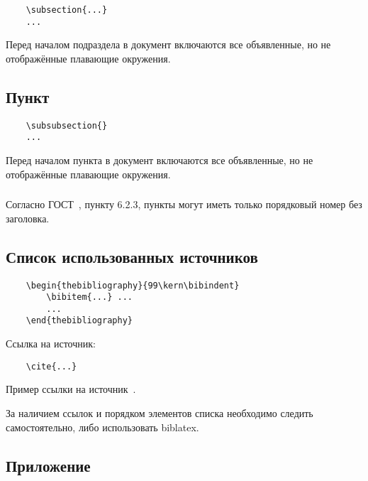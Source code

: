 \documentclass[14pt, a4paper, titlepage]{extarticle}
\begin{document}
\begin{verbatim}
	\subsection{...}
	...
\end{verbatim}

Перед началом подраздела в документ включаются все объявленные, но не отображённые плавающие окружения.

\subsection{Пункт}

\begin{verbatim}
	\subsubsection{}
	...
\end{verbatim}

Перед началом пункта в документ включаются все объявленные, но не отображённые плавающие окружения.

\subsubsection{}

Согласно ГОСТ~\cite{bib:gost732}, пункту 6.2.3, пункты могут иметь только порядковый номер без заголовка.


\subsection{Список использованных источников}

\begin{verbatim}
	\begin{thebibliography}{99\kern\bibindent}
		\bibitem{...} ...
		...
	\end{thebibliography}
\end{verbatim}

Ссылка на источник:
\begin{verbatim}
	\cite{...}
\end{verbatim}

Пример ссылки на источник~\cite{bib:recomendations}.

За наличием ссылок и порядком элементов списка необходимо следить самостоятельно, либо использовать biblatex.


\subsection{Приложение}
\end{document}
